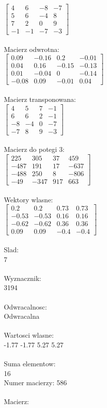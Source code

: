 \documentclass[a4paper,12pt]{article}
\begin{document}
$\begin{bmatrix} 4&6&-8&-7\\5&6&-4&8\\7&2&0&9\\-1&-1&-7&-3 \end{bmatrix}$
\\
\\
Macierz odwrotna:\\

$\begin{bmatrix} 0.09&-0.16&0.2&-0.01\\0.04&0.16&-0.15&-0.13\\0.01&-0.04&0&-0.14\\-0.08&0.09&-0.01&0.04 \end{bmatrix}$
\\
\\
Macierz transponowana:\\

$\begin{bmatrix} 4&5&7&-1\\6&6&2&-1\\-8&-4&0&-7\\-7&8&9&-3 \end{bmatrix}$
\\
\\
Macierz do potegi 3:\\

$\begin{bmatrix} 225&305&37&459\\-487&191&17&-637\\-488&250&8&-806\\-49&-347&917&663 \end{bmatrix}$
\\
\\
Wektory wlasne:\\

$\begin{bmatrix} 0.2&0.2&0.73&0.73\\-0.53&-0.53&0.16&0.16\\-0.62&-0.62&0.36&0.36\\0.09&0.09&-0.4&-0.4 \end{bmatrix}$
\\
\\
Slad:\\
7
\\
\\
Wyznacznik:\\
3194
\\
\\
Odwracalnosc:\\
Odwracalna
\\
\\
Wartosci wlasne:\\
-1.77 -1.77 5.27 5.27
\\
\\
Suma elementow:\\
16
\\
\newpage
Numer macierzy:
586
\\
\\
Macierz:\\
\end{document}
